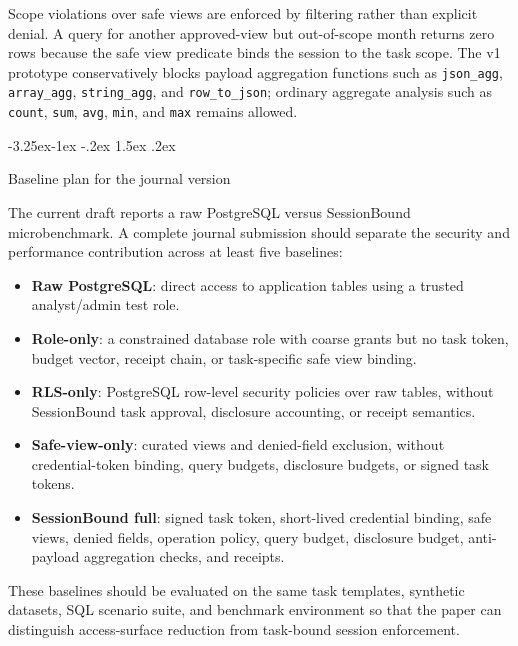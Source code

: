 \documentclass[10pt,twocolumn]{article}
\makeatletter
\providecommand{\tightlist}{%
  \setlength{\itemsep}{0pt}\setlength{\parskip}{0pt}}
\renewcommand\subsection{\@startsection{subsection}{2}{\z@}%
  {-3.25ex\@plus -1ex \@minus -.2ex}%
  {1.5ex \@plus .2ex}%
  {\normalfont\large\bfseries\raggedright}}
\makeatother
\begin{document}
Scope violations over safe views are enforced by filtering rather than
explicit denial. A query for another approved-view but out-of-scope
month returns zero rows because the safe view predicate binds the
session to the task scope. The v1 prototype conservatively blocks
payload aggregation functions such as \texttt{json\_agg},
\texttt{array\_agg}, \texttt{string\_agg}, and \texttt{row\_to\_json};
ordinary aggregate analysis such as \texttt{count}, \texttt{sum},
\texttt{avg}, \texttt{min}, and \texttt{max} remains allowed.

\hypertarget{baseline-plan-for-the-journal-version}{%
\subsection{Baseline plan for the journal
version}\label{baseline-plan-for-the-journal-version}}

The current draft reports a raw PostgreSQL versus SessionBound
microbenchmark. A complete journal submission should separate the
security and performance contribution across at least five baselines:

\begin{itemize}
\tightlist
\item
  \textbf{Raw PostgreSQL}: direct access to application tables using a
  trusted analyst/admin test role.
\item
  \textbf{Role-only}: a constrained database role with coarse grants but
  no task token, budget vector, receipt chain, or task-specific safe
  view binding.
\item
  \textbf{RLS-only}: PostgreSQL row-level security policies over raw
  tables, without SessionBound task approval, disclosure accounting, or
  receipt semantics.
\item
  \textbf{Safe-view-only}: curated views and denied-field exclusion,
  without credential-token binding, query budgets, disclosure budgets,
  or signed task tokens.
\item
  \textbf{SessionBound full}: signed task token, short-lived credential
  binding, safe views, denied fields, operation policy, query budget,
  disclosure budget, anti-payload aggregation checks, and receipts.
\end{itemize}

These baselines should be evaluated on the same task templates,
synthetic datasets, SQL scenario suite, and benchmark environment so
that the paper can distinguish access-surface reduction from
task-bound session enforcement.
\end{document}
